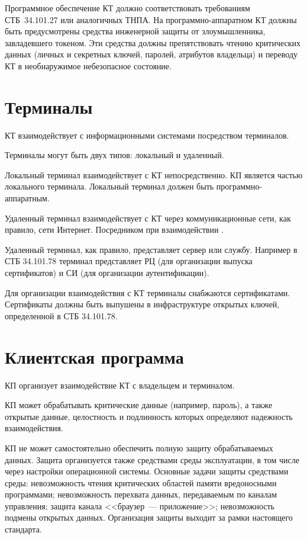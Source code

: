 Программное обеспечение КТ должно соответствовать требованиям СТБ~34.101.27 
или аналогичных ТНПА. На программно-аппаратном КТ должны быть 
предусмотрены средства инженерной защиты от злоумышленника, завладевшего 
токеном. Эти средства должны препятствовать чтению критических данных 
(личных и секретных ключей, паролей, атрибутов владельца) и переводу КТ в 
необнаружимое небезопасное состояние.  

\section{Терминалы}

КТ взаимодействует с информационными системами посредством терминалов.

Терминалы могут быть двух типов: локальный и удаленный.

Локальный терминал взаимодействует с КТ непосредственно. КП является 
частью локального терминала. Локальный терминал должен быть 
программно-аппаратным.

Удаленный терминал взаимодействует с КТ через коммуникационные сети,
как правило, сети Интернет. Посредником при взаимодействии 
. 

Удаленный терминал, как правило, представляет сервер или службу.
Например в СТБ 34.101.78 терминал представляет РЦ (для организации 
выпуска сертификатов) и СИ (для организации аутентификации). 

Для организации взаимодействия с КТ терминалы снабжаются сертификатами.
Сертификаты должны быть выпушены в инфраструктуре открытых ключей, 
определенной в СТБ 34.101.78.

\section{Клиентская программа}

КП организует взаимодействие КТ с владельцем и терминалом.

КП может обрабатывать критические данные
(например, пароль), а также открытые данные, 
целостность и подлинность которых определяют надежность  
взаимодействия.

КП не может самостоятельно 
обеспечить полную защиту обрабатываемых данных. 
Защита организуется также средствами среды эксплуатации, 
в том числе через настройки операционной системы.  
%
Основные задачи защиты средствами среды: 
невозможность чтения критических областей памяти
вредоносными программами; 
невозможность перехвата данных, передаваемым по каналам управления; 
защита канала <<браузер~--- приложение>>; 
невозможность подмены открытых данных.
%
Организация защиты выходит за рамки настоящего стандарта.

